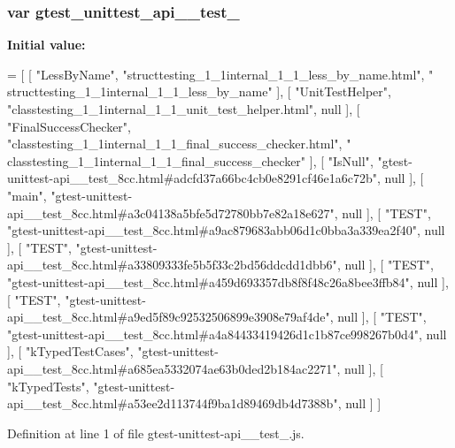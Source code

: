 \subsubsection[{\texorpdfstring{gtest\+\_\+unittest\+\_\+api\+\_\+\+\_\+test\+\_\+8cc}{gtest_unittest_api__test_8cc}}]{\setlength{\rightskip}{0pt plus 5cm}var gtest\+\_\+unittest\+\_\+api\+\_\+\+\_\+test\+\_}\hypertarget{gtest-unittest-api____test__8cc_8js_a39e1447de2c9fb556ba619ff3081b208}{}\label{gtest-unittest-api____test__8cc_8js_a39e1447de2c9fb556ba619ff3081b208}
{\bfseries Initial value\+:}
\begin{DoxyCode}
=
[
    [ \textcolor{stringliteral}{"LessByName"}, \textcolor{stringliteral}{"structtesting\_1\_1internal\_1\_1\_less\_by\_name.html"}, \textcolor{stringliteral}{"
      structtesting\_1\_1internal\_1\_1\_less\_by\_name"} ],
    [ \textcolor{stringliteral}{"UnitTestHelper"}, \textcolor{stringliteral}{"classtesting\_1\_1internal\_1\_1\_unit\_test\_helper.html"}, null ],
    [ \textcolor{stringliteral}{"FinalSuccessChecker"}, \textcolor{stringliteral}{"classtesting\_1\_1internal\_1\_1\_final\_success\_checker.html"}, \textcolor{stringliteral}{"
      classtesting\_1\_1internal\_1\_1\_final\_success\_checker"} ],
    [ \textcolor{stringliteral}{"IsNull"}, \textcolor{stringliteral}{"gtest-unittest-api\_\_test\_8cc.html#adcfd37a66bc4cb0e8291cf46e1a6c72b"}, null ],
    [ \textcolor{stringliteral}{"main"}, \textcolor{stringliteral}{"gtest-unittest-api\_\_test\_8cc.html#a3c04138a5bfe5d72780bb7e82a18e627"}, null ],
    [ \textcolor{stringliteral}{"TEST"}, \textcolor{stringliteral}{"gtest-unittest-api\_\_test\_8cc.html#a9ac879683abb06d1c0bba3a339ea2f40"}, null ],
    [ \textcolor{stringliteral}{"TEST"}, \textcolor{stringliteral}{"gtest-unittest-api\_\_test\_8cc.html#a33809333fe5b5f33c2bd56ddcdd1dbb6"}, null ],
    [ \textcolor{stringliteral}{"TEST"}, \textcolor{stringliteral}{"gtest-unittest-api\_\_test\_8cc.html#a459d693357db8f8f48c26a8bee3ffb84"}, null ],
    [ \textcolor{stringliteral}{"TEST"}, \textcolor{stringliteral}{"gtest-unittest-api\_\_test\_8cc.html#a9ed5f89c92532506899e3908e79af4de"}, null ],
    [ \textcolor{stringliteral}{"TEST"}, \textcolor{stringliteral}{"gtest-unittest-api\_\_test\_8cc.html#a4a84433419426d1c1b87ce998267b0d4"}, null ],
    [ \textcolor{stringliteral}{"kTypedTestCases"}, \textcolor{stringliteral}{"gtest-unittest-api\_\_test\_8cc.html#a685ea5332074ae63b0ded2b184ac2271"}, null ],
    [ \textcolor{stringliteral}{"kTypedTests"}, \textcolor{stringliteral}{"gtest-unittest-api\_\_test\_8cc.html#a53ee2d113744f9ba1d89469db4d7388b"}, null ]
]
\end{DoxyCode}


Definition at line 1 of file gtest-\/unittest-\/api\+\_\+\+\_\+test\+\_.\+js.

